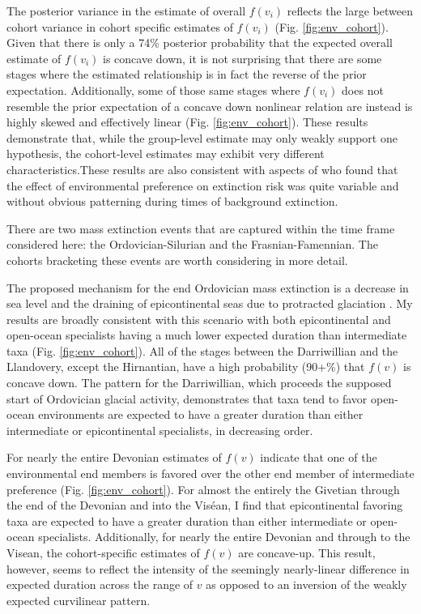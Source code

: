 \documentclass{article}
\begin{document}
The posterior variance in the estimate of overall \(f(v_{i})\) reflects the large between cohort variance in cohort specific estimates of \(f(v_{i})\) (Fig. \ref{fig:env_cohort}). Given that there is only a 74\% posterior probability that the expected overall estimate of \(f(v_{i})\) is concave down, it is not surprising that there are some stages where the estimated relationship is in fact the reverse of the prior expectation. Additionally, some of those same stages where \(f(v_{i})\) does not resemble the prior expectation of a concave down nonlinear relation are instead is highly skewed and effectively linear (Fig. \ref{fig:env_cohort}). These results demonstrate that, while the group-level estimate may only weakly support one hypothesis, the cohort-level estimates may exhibit very different characteristics.These results are also consistent with aspects of \citet{Miller2009a} who found that the effect of environmental preference on extinction risk was quite variable and without obvious patterning during times of background extinction.


There are two mass extinction events that are captured within the time frame considered here: the Ordovician-Silurian and the Frasnian-Famennian. The cohorts bracketing these events are worth considering in more detail.


The proposed mechanism for the end Ordovician mass extinction is a decrease in sea level and the draining of epicontinental seas due to protracted glaciation \citep{Sheehan2001b,Johnson1974}. My results are broadly consistent with this scenario with both epicontinental and open-ocean specialists having a much lower expected duration than intermediate taxa (Fig. \ref{fig:env_cohort}). All of the stages between the Darriwillian and the Llandovery, except the Hirnantian, have a high probability (90+\%) that \(f(v)\) is concave down. The pattern for the Darriwillian, which proceeds the supposed start of Ordovician glacial activity, demonstrates that taxa tend to favor open-ocean environments are expected to have a greater duration than either intermediate or epicontinental specialists, in decreasing order.

For nearly the entire Devonian estimates of \(f(v)\) indicate that one of the environmental end members is favored over the other end member of intermediate preference (Fig. \ref{fig:env_cohort}). For almost the entirely the Givetian through the end of the Devonian and into the Vis\'{e}an, I find that epicontinental favoring taxa are expected to have a greater duration than either intermediate or open-ocean specialists. Additionally, for nearly the entire Devonian and through to the Visean, the cohort-specific estimates of \(f(v)\) are concave-up. This result, however, seems to reflect the intensity of the seemingly nearly-linear difference in expected duration across the range of \(v\) as opposed to an inversion of the weakly expected curvilinear pattern.
\end{document}
